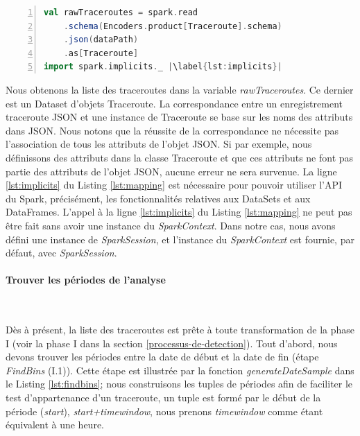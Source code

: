 \begin{lstlisting}[language=scala,firstnumber=1, caption={La lecture des données traceroutes},label={lst:mapping}, basicstyle = \footnotesize,escapechar=|,numbers=left,
stepnumber=1]
val rawTraceroutes = spark.read
	.schema(Encoders.product[Traceroute].schema)
	.json(dataPath)
	.as[Traceroute]
import spark.implicits._ |\label{lst:implicits}|
 \end{lstlisting}

Nous obtenons la liste des traceroutes dans la variable \textit{rawTraceroutes}. Ce dernier est un Dataset d'objets  Traceroute.
La correspondance entre un enregistrement traceroute JSON et une instance de Traceroute se base sur les noms des attributs dans JSON.
Nous notons que la réussite de la correspondance ne nécessite pas l'association de tous les attributs de l'objet JSON.   Si par exemple, nous définissons des attributs dans la classe Traceroute et que ces attributs ne font pas partie des attributs de l'objet JSON, aucune erreur ne sera survenue.  
La ligne \ref{lst:implicits} du Listing \ref{lst:mapping}  est nécessaire  pour pouvoir utiliser  l'API du Spark, précisément,  les fonctionnalités relatives aux DataSets et aux DataFrames. L'appel à la ligne \ref{lst:implicits} du Listing \ref{lst:mapping} ne peut pas être fait sans avoir une instance du \textit{SparkContext}. Dans notre cas, nous avons défini une instance de \textit{SparkSession}, et  l'instance  du \textit{SparkContext} est fournie, par défaut,  avec \textit{SparkSession}.



\paragraph{Trouver les périodes de l'analyse}~

Dès à présent, la liste des traceroutes est prête à toute transformation de la phase I (voir la phase I dans la section \ref{processus-de-detection}). 
Tout d'abord, nous devons trouver les périodes entre la date de début et la date de fin (étape \textit{FindBins} (I.1)). 
Cette étape est illustrée par la fonction \textit{generateDateSample}  dans le Listing \ref{lst:findbins};  
 nous construisons les tuples de périodes afin de faciliter le test d'appartenance d'un traceroute, un tuple est formé par le début de la période (\textit{start}),  \textit{start+timewindow}, nous prenons \textit{timewindow} comme étant  équivalent à une heure.



